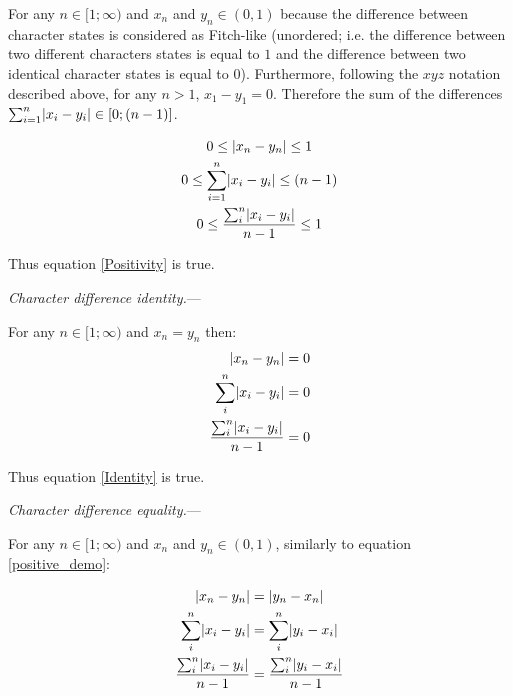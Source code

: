 \documentclass[12pt,letterpaper]{article}
\DeclarePairedDelimiter\abs{\lvert}{\rvert}%
\renewcommand{\subsection}[1]{%
\bigskip
\begin{center}
\begin{large}
\normalfont\itshape #1
\end{large}
\end{center}}
\renewcommand{\subsection}[1]{%
\vspace{2ex}
\noindent
\textit{#1.}---}
\begin{document}
For any $n \in [1;\infty)$ and $x_{n}$ and $y_{n} \in (0,1)$ because the difference between character states is considered as Fitch-like (unordered; i.e. the difference between two different characters states is equal to $1$ and the difference between two identical character states is equal to $0$).
Furthermore, following the $xyz$ notation described above, for any $n > 1$, $x_{1}-y_{1}=0$.
Therefore the sum of the differences $\sum_{i=1}^{n}\abs{x_{i}-y_{i}} \in [0;(n-1)]$.

\begin{equation}
    \label{positive_demo}
    \begin{gathered}
    0 \leq  \abs{x_{n}-y_{n}} \leq 1\\
    0 \leq  \sum_{i=1}^{n}\abs{x_{i}-y_{i}} \leq (n-1)\\
    0 \leq  \frac{\sum_{i}^{n}\abs{x_{i}-y_{i}}}{n-1} \leq 1\\
    \end{gathered}
\end{equation}

Thus equation \ref{Positivity} is true.

\newpage

\subsection{Character difference identity}

For any $n \in [1;\infty)$ and $x_{n} = y_{n}$ then:
\begin{equation}
    \label{identitydemo}
    \begin{aligned}
    \abs{x_{n}-y_{n}} &= 0\\
    \sum_{i}^{n}\abs{x_{i}-y_{i}} &= 0\\
    \frac{\sum_{i}^{n}\abs{x_{i}-y_{i}}}{n-1} &= 0\\
    \end{aligned}
\end{equation}

Thus equation \ref{Identity} is true.

\subsection{Character difference equality}

For any $n \in [1;\infty)$ and $x_{n}$ and $y_{n} \in (0,1)$, similarly to equation \ref{positive_demo}:

\begin{equation}
    \label{equality_demo}
    \begin{aligned}
    \abs{x_{n}-y_{n}} &= \abs{y_{n}-x_{n}}\\
    \sum_{i}^{n}\abs{x_{i}-y_{i}} &= \sum_{i}^{n}\abs{y_{i}-x_{i}}\\
    \frac{\sum_{i}^{n}\abs{x_{i}-y_{i}}}{n-1} &= \frac{\sum_{i}^{n}\abs{y_{i}-x_{i}}}{n-1}\\
    \end{aligned}
\end{equation}
\end{document}
